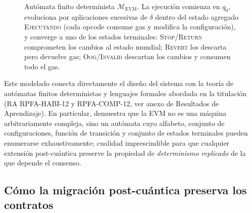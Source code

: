 \begin{figure}[htbp]
\centering
{}
\caption{Autómata finito determinista $\mathcal{M}_{\text{EVM}}$. La ejecución comienza en $q_0$, evoluciona por aplicaciones sucesivas de $\delta$ dentro del estado agregado \textsc{Ejecutando} (cada opcode consume gas y modifica la configuración), y converge a uno de los estados terminales: \textsc{Stop}/\textsc{Return} comprometen los cambios al estado mundial; \textsc{Revert} los descarta pero devuelve gas; \textsc{Oog}/\textsc{Invalid} descartan los cambios y consumen todo el gas.}
\label{fig:evm_dfa}
\end{figure}

Este modelado conecta directamente el diseño del sistema con la teoría de autómatas finitos deterministas y lenguajes formales abordada en la titulación (RA RPFA-HABI-12 y RPFA-COMP-12, ver anexo de Resultados de Aprendizaje). En particular, demuestra que la EVM no es una máquina arbitrariamente compleja, sino un autómata cuyo alfabeto, conjunto de configuraciones, función de transición y conjunto de estados terminales pueden enumerarse exhaustivamente; cualidad imprescindible para que cualquier extensión post-cuántica preserve la propiedad de \emph{determinismo replicado} de la que depende el consenso.

\subsection{Cómo la migración post-cuántica preserva los contratos}

